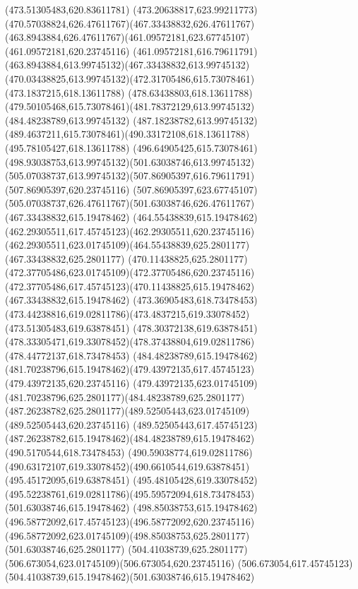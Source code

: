 {{{	\lineto(473.51305483,620.83611781)
	\curveto(473.20638817,623.99211773)(470.57038824,626.47611767)(467.33438832,626.47611767)
	\curveto(463.8943884,626.47611767)(461.09572181,623.67745107)(461.09572181,620.23745116)
	\curveto(461.09572181,616.79611791)(463.8943884,613.99745132)(467.33438832,613.99745132)
	\curveto(470.03438825,613.99745132)(472.31705486,615.73078461)(473.1837215,618.13611788)
	\lineto(478.63438803,618.13611788)
	\curveto(479.50105468,615.73078461)(481.78372129,613.99745132)(484.48238789,613.99745132)
	\curveto(487.18238782,613.99745132)(489.4637211,615.73078461)(490.33172108,618.13611788)
	\lineto(495.78105427,618.13611788)
	\curveto(496.64905425,615.73078461)(498.93038753,613.99745132)(501.63038746,613.99745132)
	\curveto(505.07038737,613.99745132)(507.86905397,616.79611791)(507.86905397,620.23745116)
	\curveto(507.86905397,623.67745107)(505.07038737,626.47611767)(501.63038746,626.47611767)
	\moveto(467.33438832,615.19478462)
	\curveto(464.55438839,615.19478462)(462.29305511,617.45745123)(462.29305511,620.23745116)
	\curveto(462.29305511,623.01745109)(464.55438839,625.2801177)(467.33438832,625.2801177)
	\curveto(470.11438825,625.2801177)(472.37705486,623.01745109)(472.37705486,620.23745116)
	\curveto(472.37705486,617.45745123)(470.11438825,615.19478462)(467.33438832,615.19478462)
	\moveto(473.36905483,618.73478453)
	\curveto(473.44238816,619.02811786)(473.4837215,619.33078452)(473.51305483,619.63878451)
	\lineto(478.30372138,619.63878451)
	\curveto(478.33305471,619.33078452)(478.37438804,619.02811786)(478.44772137,618.73478453)
	\closepath
	\moveto(484.48238789,615.19478462)
	\curveto(481.70238796,615.19478462)(479.43972135,617.45745123)(479.43972135,620.23745116)
	\curveto(479.43972135,623.01745109)(481.70238796,625.2801177)(484.48238789,625.2801177)
	\curveto(487.26238782,625.2801177)(489.52505443,623.01745109)(489.52505443,620.23745116)
	\curveto(489.52505443,617.45745123)(487.26238782,615.19478462)(484.48238789,615.19478462)
	\moveto(490.5170544,618.73478453)
	\curveto(490.59038774,619.02811786)(490.63172107,619.33078452)(490.6610544,619.63878451)
	\lineto(495.45172095,619.63878451)
	\curveto(495.48105428,619.33078452)(495.52238761,619.02811786)(495.59572094,618.73478453)
	\closepath
	\moveto(501.63038746,615.19478462)
	\curveto(498.85038753,615.19478462)(496.58772092,617.45745123)(496.58772092,620.23745116)
	\curveto(496.58772092,623.01745109)(498.85038753,625.2801177)(501.63038746,625.2801177)
	\curveto(504.41038739,625.2801177)(506.673054,623.01745109)(506.673054,620.23745116)
	\curveto(506.673054,617.45745123)(504.41038739,615.19478462)(501.63038746,615.19478462)
}}}
